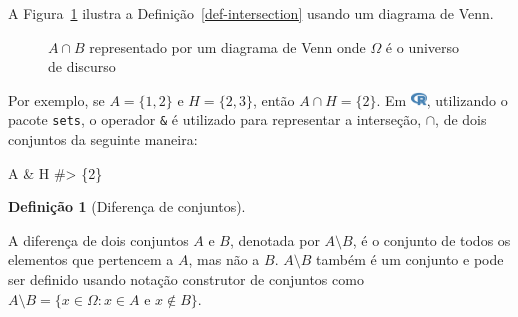 \documentclass[
  letterpaper,
]{book}
\newenvironment{Shaded}{\begin{snugshade}}{\end{snugshade}}
\newcommand{\CommentTok}[1]{\textcolor[rgb]{0.37,0.37,0.37}{#1}}
\newcommand{\NormalTok}[1]{\textcolor[rgb]{0.00,0.23,0.31}{#1}}
\newcommand{\SpecialCharTok}[1]{\textcolor[rgb]{0.37,0.37,0.37}{#1}}
\theoremstyle{plain}
\theoremstyle{definition}
\newtheorem{definition}{Definição}[chapter]
\theoremstyle{remark}
\begin{document}
A Figura~\ref{fig-intersection-venn-diagram} ilustra a
Definição~\ref{def-intersection} usando um diagrama de Venn.

\begin{figure}


\caption{\label{fig-intersection-venn-diagram}\(A \cap B\) representado
por um diagrama de Venn onde \(\Omega\) é o universo de discurso}

\end{figure}%

Por exemplo, se \(A = \{ 1, 2 \}\) e \(H = \{ 2, 3 \}\), então
\(A \cap H = \{ 2 \}\). Em
\includegraphics[width=1.13em,height=1em]{naive_set_theory_files/figure-pdf/fa-icon-9b00320707d42527dde67262afb33ded.pdf},
utilizando o pacote \texttt{sets}, o operador \texttt{\&} é utilizado
para representar a interseção, \(\cap\), de dois conjuntos da seguinte
maneira:

\begin{Shaded}
\begin{Highlighting}[]
\NormalTok{A }\SpecialCharTok{\&}\NormalTok{ H}
\CommentTok{\#\textgreater{} \{2\}}
\end{Highlighting}
\end{Shaded}

\begin{definition}[Diferença de
conjuntos]\protect\hypertarget{def-difference}{}\label{def-difference}

A diferença de dois conjuntos \(A\) e \(B\), denotada por
\(A \setminus B\), é o conjunto de todos os elementos que pertencem a
\(A\), mas não a \(B\). \(A \setminus B\) também é um conjunto e pode
ser definido usando notação construtor de conjuntos como
\(A \setminus B = \{ x \in \Omega : x \in A \text{ e } x \notin B \}\).

\end{definition}
\end{document}
